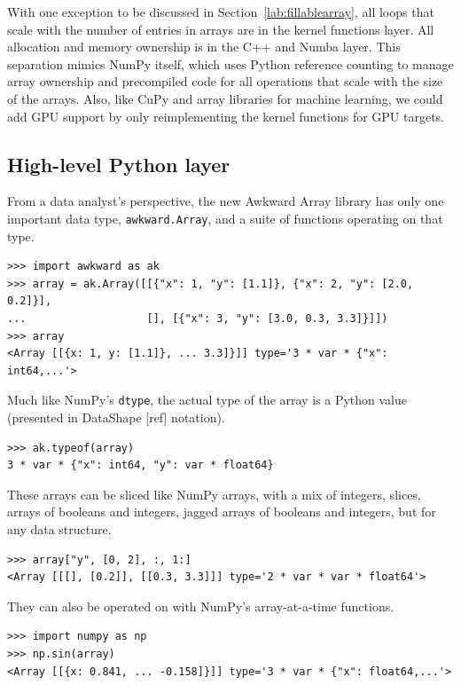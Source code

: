 \documentclass{webofc}
\begin{document}
\noindent With one exception to be discussed in Section~\ref{lab:fillablearray}, all loops that scale with the number of entries in arrays are in the kernel functions layer. All allocation and memory ownership is in the C++ and Numba layer. This separation mimics NumPy itself, which uses Python reference counting to manage array ownership and precompiled code for all operations that scale with the size of the arrays. Also, like CuPy and array libraries for machine learning, we could add GPU support by only reimplementing the kernel functions for GPU targets.

\subsection{High-level Python layer}
\label{lab:high-level}

From a data analyst's perspective, the new Awkward Array library has only one important data type, \texttt{awkward.Array}, and a suite of functions operating on that type.

\begin{verbatim}
>>> import awkward as ak
>>> array = ak.Array([[{"x": 1, "y": [1.1]}, {"x": 2, "y": [2.0, 0.2]}],
...                   [], [{"x": 3, "y": [3.0, 0.3, 3.3]}]])
>>> array
<Array [[{x: 1, y: [1.1]}, ... 3.3]}]] type='3 * var * {"x": int64,...'>
\end{verbatim}

\noindent Much like NumPy's \texttt{dtype}, the actual type of the array is a Python value (presented in DataShape [ref] notation).

\begin{verbatim}
>>> ak.typeof(array)
3 * var * {"x": int64, "y": var * float64}
\end{verbatim}

\noindent These arrays can be sliced like NumPy arrays, with a mix of integers, slices, arrays of booleans and integers, jagged arrays of booleans and integers, but for any data structure.

\begin{verbatim}
>>> array["y", [0, 2], :, 1:]
<Array [[[], [0.2]], [[0.3, 3.3]]] type='2 * var * var * float64'>
\end{verbatim}

\noindent They can also be operated on with NumPy's array-at-a-time functions.

\begin{verbatim}
>>> import numpy as np
>>> np.sin(array)
<Array [[{x: 0.841, ... -0.158]}]] type='3 * var * {"x": float64,...'>
\end{verbatim}
\end{document}
